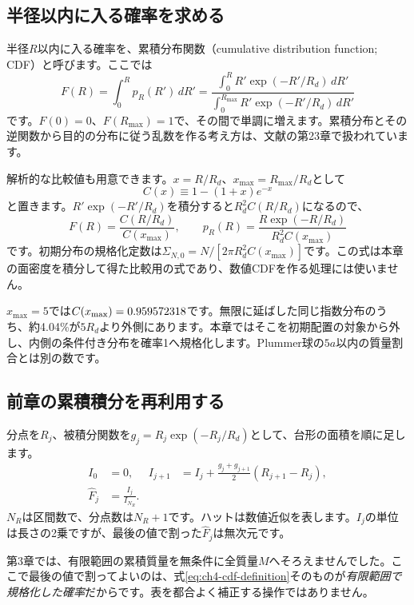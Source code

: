 \subsection{半径以内に入る確率を求める}
半径$R$以内に入る確率を、累積分布関数（cumulative distribution function; CDF）と呼びます。ここでは
\begin{equation}
F(R)=\int_0^R p_R(R')\,dR'
=\frac{\displaystyle\int_0^R R'\exp(-R'/R_d)\,dR'}
       {\displaystyle\int_0^{R_{\max}}R'\exp(-R'/R_d)\,dR'}
\label{eq:ch4-cdf-definition}
\end{equation}
です。$F(0)=0$、$F(R_{\max})=1$で、その間で単調に増えます。累積分布とその逆関数から目的の分布に従う乱数を作る考え方は、文献\cite{irifuji1985}の第23章で扱われています。

解析的な比較値も用意できます。$x=R/R_d$、$x_{\max}=R_{\max}/R_d$として
\begin{equation}
C(x)\equiv 1-(1+x)e^{-x}
\label{eq:ch4-C}
\end{equation}
と置きます。$R'\exp(-R'/R_d)$を積分すると$R_d^2 C(R/R_d)$になるので、
\begin{equation}
F(R)=\frac{C(R/R_d)}{C(x_{\max})},\qquad
p_R(R)=\frac{R\exp(-R/R_d)}{R_d^2 C(x_{\max})}
\label{eq:ch4-cdf-exact}
\end{equation}
です。初期分布の規格化定数は$\Sigma_{N,0}=N/[2\pi R_d^2C(x_{\max})]$です。この式は本章の面密度を積分して得た比較用の式であり、数値CDFを作る処理には使いません。

$x_{\max}=5$では$C(x_{\max})=0.959572318$です。無限に延ばした同じ指数分布のうち、約4.04\%が$5R_d$より外側にあります。本章ではそこを初期配置の対象から外し、内側の条件付き分布を確率1へ規格化します。Plummer球の$5a$以内の質量割合とは別の数です。

\subsection{前章の累積積分を再利用する}
分点を$R_j$、被積分関数を$g_j=R_j\exp(-R_j/R_d)$として、台形の面積を順に足します。
\begin{align}
I_0&=0, & I_{j+1}&=I_j+\frac{g_j+g_{j+1}}{2}(R_{j+1}-R_j),\label{eq:ch4-cumulative-trapezoid}\\
\widehat F_j&=\frac{I_j}{I_{N_R}}.\label{eq:ch4-numeric-cdf}
\end{align}
$N_R$は区間数で、分点数は$N_R+1$です。ハットは数値近似を表します。$I_j$の単位は長さの2乗ですが、最後の値で割った$\widehat F_j$は無次元です。

第3章では、有限範囲の累積質量を無条件に全質量$M$へそろえませんでした。ここで最後の値で割ってよいのは、式\eqref{eq:ch4-cdf-definition}そのものが\emph{有限範囲で規格化した確率}だからです。表を都合よく補正する操作ではありません。

